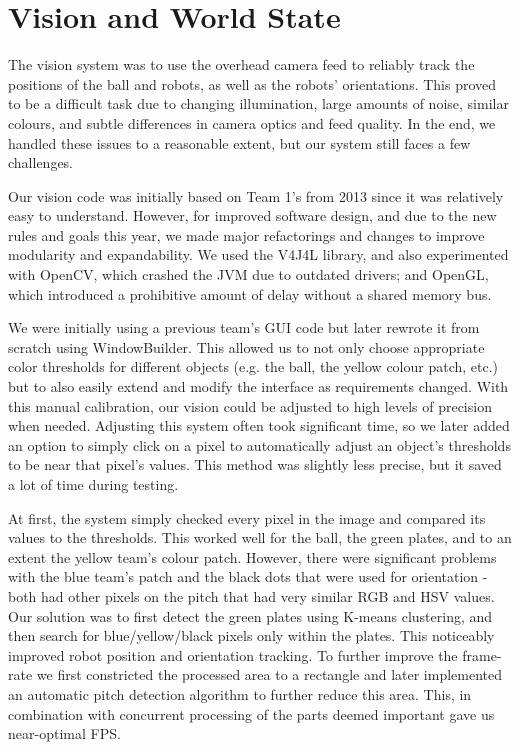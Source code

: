 \documentclass[a4paper,11pt]{article}
\begin{document}

\section{Vision and World State}

The vision system was to use the overhead camera feed to reliably track the positions of the ball and robots, as well as the robots' orientations. This proved to be a difficult task due to changing illumination, large amounts of noise, similar colours, and subtle differences in camera optics and feed quality. In the end, we handled these issues to a reasonable extent, but our system still faces a few challenges.

Our vision code was initially based on Team 1's from 2013 since it was relatively easy to understand. However, for improved software design, and due to the new rules and goals this year, we made major refactorings and changes to improve modularity and expandability. We used the V4J4L library, and also experimented with OpenCV, which crashed the JVM due to outdated drivers; and OpenGL, which introduced a prohibitive amount of delay without a shared memory bus.

We were initially using a previous team's GUI code but later rewrote it from scratch using WindowBuilder. This allowed us to not only choose appropriate color thresholds for different objects (e.g. the ball, the yellow colour patch, etc.) but to also easily extend and modify the interface as requirements changed. With this manual calibration, our vision could be adjusted to high levels of precision when needed. Adjusting this system often took significant time, so we later added an option to simply click on a pixel to automatically adjust an object's thresholds to be near that pixel's values. This method was slightly less precise, but it saved a lot of time during testing.

At first, the system simply checked every pixel in the image and compared its values to the thresholds. This worked well for the ball, the green plates, and to an extent the yellow team's colour patch. However, there were significant problems with the blue team's patch and the black dots that were used for orientation - both had other pixels on the pitch that had very similar RGB and HSV values. Our solution was to first detect the green plates using K-means clustering, and then search for blue/yellow/black pixels only within the plates. This noticeably improved robot position and orientation tracking. To further improve the frame-rate we first constricted the processed area to a rectangle and later implemented an automatic pitch detection algorithm to further reduce this area. This, in combination with concurrent processing of the parts deemed important gave us near-optimal FPS. 
\end{document}
